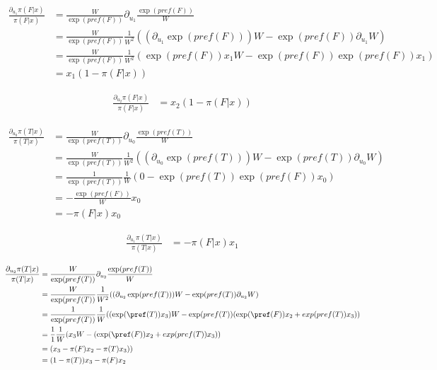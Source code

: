 \documentclass{article}
\begin{document}
\begin{align*}
\frac{\partial_{u_1} \pi(F|x)}{\pi(F|x)}
&= \frac{W}{\exp(pref(F))} \partial_{u_1} \frac{\exp(pref(F)) }{W}\\
&=\frac{W}{\exp(pref(F))} \frac{1}{W^2} ((\partial_{u_1} \exp(pref(F))) W -  \exp(pref(F)) \partial_{u_1} W)\\
&=\frac{W}{\exp(pref(F))} \frac{1}{W^2} (\exp(pref(F)) x_1 W -  \exp(pref(F))\exp(pref(F)) x_1 )\\
&=x_1  ( 1 - \pi(F|x) )
\end{align*}


\begin{align*}
\frac{\partial_{u_2} \pi(F|x)}{\pi(F|x)}
&=x_2  ( 1 - \pi(F|x) )
\end{align*}

\hline

\begin{align*}
\frac{\partial_{u_0} \pi(T|x)}{\pi(T|x)}
&= \frac{W}{\exp(pref(T))} \partial_{u_0} \frac{\exp(pref(T)) }{W}\\
&=\frac{W}{\exp(pref(T))} \frac{1}{W^2} ((\partial_{u_0} \exp(pref(T))) W -  \exp(pref(T)) \partial_{u_0} W)\\
&=\frac{1}{\exp(pref(T))} \frac{1}{W} (0 -  \exp(pref(T))\exp(pref(F)) x_0 )\\
&= -\frac{\exp(pref(F))}{W}   x_0 \\
&=   - \pi(F|x) x_0
\end{align*}


\begin{align*}
\frac{\partial_{u_1} \pi(T|x)}{\pi(T|x)}
&=   - \pi(F|x) x_1
\end{align*}



\begin{align*}
\frac{\partial_{u_2} \pi(T|x)}{\pi(T|x)}
&= \frac{W}{\exp(pref(T))} \partial_{u_2} \frac{\exp(pref(T)) }{W}\\
&=\frac{W}{\exp(pref(T))} \frac{1}{W^2} ((\partial_{u_2} \exp(pref(T))) W -  \exp(pref(T)) \partial_{u_2} W)\\
&=\frac{1}{\exp(pref(T))} \frac{1}{W} ((\exp(\pref(T))x_3 ) W -  \exp(pref(T)) (\exp(\pref(F))x_2 + exp(pref(T))x_3  ) )\\
&=\frac{1}{1} \frac{1}{W} (x_3  W -  (\exp(\pref(F))x_2 + exp(pref(T))x_3  ) )\\
&=  (x_3   - \pi(F) x_2 - \pi(T)x_3  ) )\\
&=  (1 - \pi(T))x_3   - \pi(F) x_2   \\
\end{align*}
\end{document}
